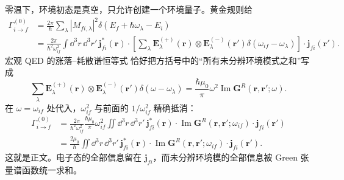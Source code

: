 \begin{derivation}
零温下，环境初态是真空，只允许创建一个环境量子。黄金规则给
\begin{align*}
\Gamma_{i\to f}^{(0)}
&=\frac{2\pi}{\hbar}
\sum_\lambda |M_{fi,\lambda}|^2
\delta(E_f+\hbar\omega_\lambda-E_i)\\
&=\frac{2\pi}{\hbar^2\omega_{if}^2}
\int\dd^3 r\,\dd^3 r'\,
\mathbf j_{fi}^*(\mathbf r)\cdot
\left[\sum_\lambda
\mathbf E_\lambda^{(+)}(\mathbf r)\otimes
\mathbf E_\lambda^{(-)}(\mathbf r')
\delta(\omega_{if}-\omega_\lambda)\right]
\cdot\mathbf j_{fi}(\mathbf r').
\end{align*}
宏观 QED 的涨落--耗散谱恒等式 恰好把方括号中的“所有未分辨环境模式之和”写成
\begin{equation*}
\sum_\lambda
\mathbf E_\lambda^{(+)}(\mathbf r)\otimes
\mathbf E_\lambda^{(-)}(\mathbf r')
\delta(\omega-\omega_\lambda)
=\frac{\hbar\mu_0}{\pi}\omega^2
\operatorname{Im}\mathbf G^R(\mathbf r,\mathbf r';\omega).
\end{equation*}
在 $\omega=\omega_{if}$ 处代入，$\omega_{if}^2$ 与前面的
$1/\omega_{if}^2$ 精确抵消：
\begin{align*}
\Gamma_{i\to f}^{(0)}
&=\frac{2\pi}{\hbar^2\omega_{if}^2}
\frac{\hbar\mu_0}{\pi}\omega_{if}^2
\iint\dd^3r\,\dd^3r'\,
\mathbf j_{fi}^*(\mathbf r)\cdot
\operatorname{Im}\mathbf G^R(\mathbf r,\mathbf r';\omega_{if})
\cdot\mathbf j_{fi}(\mathbf r')\\
&=\boxed{
\frac{2\mu_0}{\hbar}
\iint\dd^3r\,\dd^3r'\,
\mathbf j_{fi}^*(\mathbf r)\cdot
\operatorname{Im}\mathbf G^R(\mathbf r,\mathbf r';\omega_{if})
\cdot\mathbf j_{fi}(\mathbf r')}.
\end{align*}
这就是正文。电子态的全部信息留在 $\mathbf j_{fi}$，而未分辨环境模的全部信息被 Green 张量谱函数统一求和。
\end{derivation}



